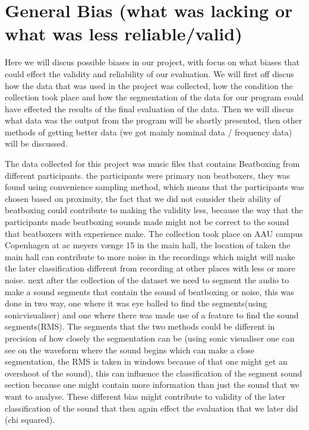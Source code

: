 \section{General Bias (what was lacking or what was less reliable/valid)}
Here we will discus possible biases in our project, with focus on what biases that could effect the validity and reliability of our evaluation. We will first off discus how the data that was used in the project was collected, how the condition the collection took place and how the segmentation of the data for our program could have effected the results of the final evaluation of the data. Then we will discus what data was the output from the program will be shortly presented, then other methods of getting better data (we got mainly nominal data / frequency data) will be discussed.

The data collected for this project was music files that contains Beatboxing from different participants. the participants were primary non beatboxers, they was found using convenience sampling method, which means that the participants was chosen based on proximity,  the fact that we did not consider their ability of beatboxing could contribute to making the validity less, because the way that the participants made beatboxing sounds made might not be correct to the sound that beatboxers with experience make. The collection took place on AAU campus Copenhagen at ac meyers vænge 15 in the main hall, the location of taken the main hall can contribute to more noise in the recordings which might will make the later classification different from recording at other places with less or more noise. next after the collection of the dataset we need to segment the audio to make a sound segments that contain the sound of beatboxing or noise, this was done in two way, one where it was eye balled to find the segments(using sonicvisualiser) and one where there was made use of a feature to find the sound segments(RMS). The segments that the two methods could be different in precision of how closely the segmentation can be (using sonic visualiser one can see on the waveform where the sound begins which can make a close segmentation, the RMS is taken in windows because of that one might get an overshoot of the sound), this can influence the classification of the segment sound section because one might contain more information than just the sound that we want to analyse. These different bias might contribute to validity of the later classification of the sound that then again effect the evaluation that we later did (chi squared).

